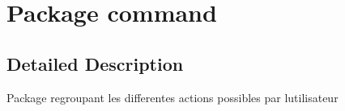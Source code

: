 \hypertarget{namespacecommand}{}\section{Package command}
\label{namespacecommand}


\subsection{Detailed Description}
Package regroupant les differentes actions possibles par l\textquotesingle{}utilisateur 